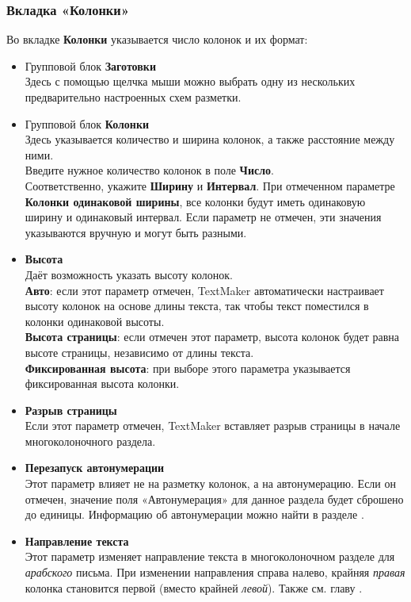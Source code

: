 ﻿\documentclass[a4paper,10pt]{article}
\begin{document}
\subsubsection{Вкладка «Колонки»}
Во вкладке \textbf{Колонки} указывается число колонок и их формат:
\begin{itemize}
 \item Групповой блок \textbf{Заготовки}\\
 Здесь с помощью щелчка мыши можно выбрать одну из нескольких предварительно настроенных схем разметки.
 \item Групповой блок \textbf{Колонки}\\
 Здесь указывается количество и ширина колонок, а также расстояние между ними.\\
 Введите нужное количество колонок в поле \textbf{Число}.\\
 Соответственно, укажите \textbf{Ширину} и \textbf{Интервал}. При отмеченном параметре \textbf{Колонки одинаковой ширины}, все колонки будут иметь одинаковую ширину и одинаковый интервал. Если параметр не отмечен, эти значения указываются вручную и могут быть разными.
 \item \textbf{Высота}\\
 Даёт возможность указать высоту колонок.\\
 \textbf{Авто}: если этот параметр отмечен, TextMaker автоматически настраивает высоту колонок на основе длины текста, так чтобы текст поместился в колонки одинаковой высоты.\\
 \textbf{Высота страницы}: если отмечен этот параметр, высота колонок будет равна высоте страницы, независимо от длины текста.\\
 \textbf{Фиксированная высота}: при выборе этого параметра указывается фиксированная высота колонки.
 \item \textbf{Разрыв страницы}\\
 Если этот параметр отмечен, TextMaker вставляет разрыв страницы в начале многоколоночного раздела.
 \item \textbf{Перезапуск автонумерации}\\
 Этот параметр влияет не на разметку колонок, а на автонумерацию. Если он отмечен, значение поля «Автонумерация» для данное раздела будет сброшено до единицы. Информацию об автонумерации можно найти в разделе .
 \item \textbf{Направление текста}\\
 Этот параметр изменяет направление текста в многоколоночном разделе для \textit{арабского} письма. При изменении направления справа налево, крайняя \textit{правая} колонка становится первой (вместо крайней \textit{левой}). Также см. главу .

\end{itemize}
\end{document}

